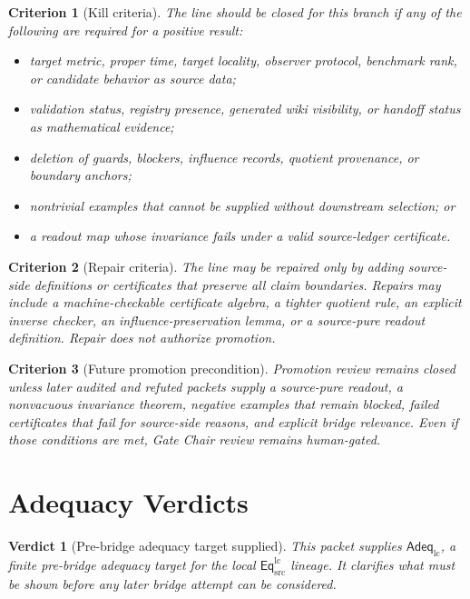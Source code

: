 \documentclass[11pt]{article}
\newcommand{\EqLC}{\mathsf{Eq}_{\mathrm{src}}^{\mathrm{lc}}}
\newcommand{\AdeqLC}{\mathsf{Adeq}_{\mathrm{lc}}}
\newtheorem{criterion}{Criterion}
\newtheorem{verdict}{Verdict}
\begin{document}
\begin{criterion}[Kill criteria]
The line should be closed for this branch if any of the following are
required for a positive result:
\begin{itemize}
    \item target metric, proper time, target locality, observer
    protocol, benchmark rank, or candidate behavior as source data;
    \item validation status, registry presence, generated wiki
    visibility, or handoff status as mathematical evidence;
    \item deletion of guards, blockers, influence records, quotient
    provenance, or boundary anchors;
    \item nontrivial examples that cannot be supplied without
    downstream selection; or
    \item a readout map whose invariance fails under a valid
    source-ledger certificate.
\end{itemize}
\end{criterion}

\begin{criterion}[Repair criteria]
The line may be repaired only by adding source-side definitions or
certificates that preserve all claim boundaries. Repairs may include a
machine-checkable certificate algebra, a tighter quotient rule, an
explicit inverse checker, an influence-preservation lemma, or a
source-pure readout definition. Repair does not authorize promotion.
\end{criterion}

\begin{criterion}[Future promotion precondition]
Promotion review remains closed unless later audited and refuted
packets supply a source-pure readout, a nonvacuous invariance theorem,
negative examples that remain blocked, failed certificates that fail for
source-side reasons, and explicit bridge relevance. Even if those
conditions are met, Gate Chair review remains human-gated.
\end{criterion}

\section{Adequacy Verdicts}

\begin{verdict}[Pre-bridge adequacy target supplied]
This packet supplies \(\AdeqLC\), a finite pre-bridge adequacy target
for the local \(\EqLC\) lineage. It clarifies what must be shown before
any later bridge attempt can be considered.
\end{verdict}
\end{document}
